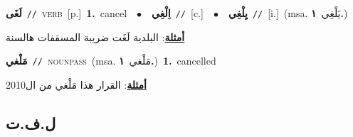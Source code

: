 \documentclass[10pt,a4paper,twoside]{article} %
\begin{document}
\begin{multicols}{2}
{\setlength\topsep{0pt}\textbf{\foreignlanguage{arabic}{لَغَى}}\ {\color{gray}\texttt{//}\color{black}}\ \textsc{verb}\ [p.]\ \textbf{1.}~cancel\ \ $\bullet$\ \ \setlength\topsep{0pt}\textbf{\foreignlanguage{arabic}{اِلْغِي}}\ {\color{gray}\texttt{//}\color{black}}\ [c.]\ \ $\bullet$\ \ \setlength\topsep{0pt}\textbf{\foreignlanguage{arabic}{يِلْغِي}}\ {\color{gray}\texttt{//}\color{black}}\ [i.]\ \color{gray}(msa. \foreignlanguage{arabic}{يَلْغِي}~\foreignlanguage{arabic}{\textbf{١.}})\color{black}\  \begin{flushright}\color{gray}\foreignlanguage{arabic}{\textbf{\underline{\foreignlanguage{arabic}{أمثلة}}}: البلدية لَغَت ضريبة المسقفات هالسنة}\end{flushright}\color{black}} \vspace{2mm}

{\setlength\topsep{0pt}\textbf{\foreignlanguage{arabic}{مَلْغي}}\ {\color{gray}\texttt{//}\color{black}}\ \textsc{noun\textunderscore pass}\ \color{gray}(msa. \foreignlanguage{arabic}{مَلْغي}~\foreignlanguage{arabic}{\textbf{١.}})\color{black}\ \textbf{1.}~cancelled\  \begin{flushright}\color{gray}\foreignlanguage{arabic}{\textbf{\underline{\foreignlanguage{arabic}{أمثلة}}}: القرار هذا مَلْغي من ال2010}\end{flushright}\color{black}} \vspace{2mm}

\vspace{-3mm}
\subsection*{\color{blue}\foreignlanguage{arabic}{ل.ف.ت}\color{blue}{}} 


\end{multicols}
\end{document}
